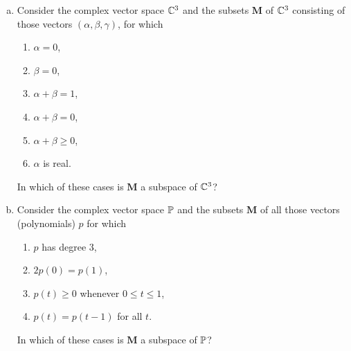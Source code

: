 \begin{problem}
\begin{enumerate}[(a)]
    \item Consider the complex vector space $\C^3$ and the subsets $\mathbf{M}$ of $\C^3$ consisting of those vectors $(\alpha,\beta,\gamma)$, for which

          \begin{enumerate}[(1)]
              \item $\alpha = 0$,
              \item $\beta = 0$,
              \item $\alpha + \beta = 1$,
              \item $\alpha + \beta = 0$,
              \item $\alpha + \beta \geq 0$,
              \item $\alpha$ is real.
          \end{enumerate}

          In which of these cases is $\mathbf{M}$ a subspace of $\C^3$?

    \item Consider the complex vector space $\P$ and the subsets $\mathbf{M}$ of all those vectors (polynomials) $p$ for which

          \begin{enumerate}[(1)]
              \item $p$ has degree $3$,
              \item $2p(0) = p(1)$,
              \item $p(t) \geq 0$ whenever $0 \leq t \leq 1$,
              \item $p(t) = p(t-1)$ for all $t$.
          \end{enumerate}

          In which of these cases is $\mathbf{M}$ a subspace of $\P$?
\end{enumerate}
\end{problem}

